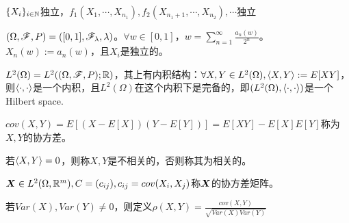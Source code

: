 \documentclass{ctexbook}
\begin{document}
\begin{Eg}
  $\{X_{i}\}_{i\in\mathbb{N}}$独立，$f_{1}(X_{1},\cdots,X_{n_{1}}),f_{2}(X_{n_{1}+1},\cdots, X_{n_{2}}),\cdots$独立
\end{Eg}

\begin{Eg}[由乘积空间构造独立性]
  $(\Omega,\mathscr{F},P)=([0,1],\mathscr{F}_{\lambda},\lambda)$。$\forall w\in [0,1]$，$w=\sum_{n=1}^{\infty}\frac{a_{n}(w)}{2^{n}}$。$X_{n}(w):=a_{n}(w)$，且$X_{i}$是独立的。
\end{Eg}

$L^{2}(\Omega)=L^{2}((\Omega,\mathscr{F},P);\mathbb{R})$，其上有内积结构：$\forall X,Y\in L^{2}(\Omega),\left<X,Y\right>:=E[XY]$，则$\left<\cdot,\cdot\right>$是一个内积，且$L^{2}(\Omega)$在这个内积下是完备的，即$(L^{2}(\Omega),\left<\cdot,\cdot\right>)$是一个Hilbert space.

\begin{Def}
  $cov(X,Y)=E[(X-E[X])(Y-E[Y])]=E[XY]-E[X]E[Y]$称为$X,Y$的协方差。

  若$\left<X,Y\right>=0$，则称$X,Y$是不相关的，否则称其为相关的。

$\bm{X}\in L^{2}(\Omega,\mathbb{R}^{m}),C=(c_{ij}),c_{ij}=cov(X_{i},X_{j})$称$\bm{X}$的协方差矩阵。

若$Var(X),Var(Y)\neq 0$，则定义$\rho(X,Y)=\frac{cov(X,Y)}{\sqrt{Var(X)Var(Y)}}$
\end{Def}

\begin{comment}
\begin{Eg}
  $\{X_{i}\}_{i=1}^{n}$是独立的随机变量，$S_{n}=\sum_{i=1}^{n}X_{i}$，求$Var(S_{n})$
\end{Eg}
\end{comment}
\end{document}
